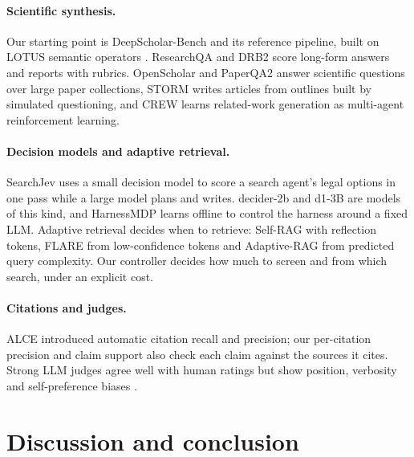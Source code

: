 \documentclass[11pt, letterpaper]{article}
\begin{document}
\paragraph{Scientific synthesis.} Our starting point is DeepScholar-Bench \cite{patel2025deepscholar}
and its reference pipeline, built on LOTUS semantic operators \cite{patel2024lotus}. ResearchQA
\cite{li2025researchqa} and DRB2 \cite{li2026drb2} score long-form answers and reports with rubrics.
OpenScholar \cite{asai2026openscholar} and PaperQA2 \cite{skarlinski2024paperqa2} answer scientific
questions over large paper collections, STORM \cite{shao2024storm} writes articles from outlines
built by simulated questioning, and CREW \cite{dang2026crew} learns related-work generation as
multi-agent reinforcement learning.

\paragraph{Decision models and adaptive retrieval.} SearchJev \cite{cao2026searchjev} uses a small
decision model to score a search agent's legal options in one pass while a large model plans and
writes. decider-2b \cite{mapika2026decider} and d1-3B \cite{liquidai2026d1} are models of this kind,
and HarnessMDP \cite{yi2026harnessmdp} learns offline to control the harness around a fixed LLM.
Adaptive retrieval decides when to retrieve: Self-RAG \cite{asai2024selfrag} with reflection tokens,
FLARE \cite{jiang2023flare} from low-confidence tokens and Adaptive-RAG \cite{jeong2024adaptiverag}
from predicted query complexity. Our controller decides how much to screen and from which search,
under an explicit cost.

\paragraph{Citations and judges.} ALCE \cite{gao2023alce} introduced automatic citation recall and
precision; our per-citation precision and claim support also check each claim against the sources
it cites. Strong LLM judges agree well with human ratings but show position, verbosity and
self-preference biases \cite{zheng2023judge, panickssery2024selfpref}.

\section{Discussion and conclusion}
\end{document}
